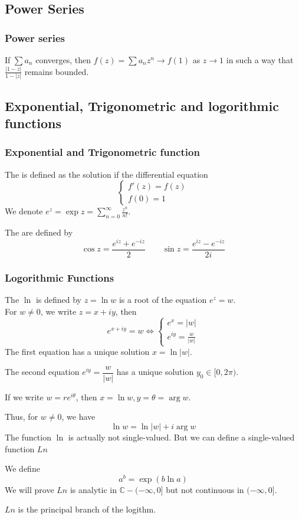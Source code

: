 \subsection{Power Series}
\subsubsection{Power series}
\begin{theorem}
If  $ \sum a_n  $ converges, then  $ f(z)=\sum a_nz^n\rightarrow f(1)  $ as  $ z\rightarrow 1  $ in such a way that  $ \frac{|1-z| }{1-|z| } $ remains bounded.
\end{theorem}
\subsection{Exponential, Trigonometric and logorithmic functions}
\subsubsection{Exponential and Trigonometric function}
The  is defined as the solution if the differential equation
\[\left\{
    \begin{aligned}
        f'(z)=f(z)\\
        f(0)=1
    \end{aligned}
\right.\]
We denote  $ e^z=\exp z=\sum\limits_{n=0}^\infty \frac{z^n}{n!} $.

The  are defined by 
\[\cos z=\frac{e^{iz}+e^{-iz}}{2}\qquad \sin z=\frac{e^{iz}-e^{-iz}}{2i}\]
\subsubsection{Logorithmic Functions}
The   $ \ln  $ is defined by  $ z=\ln w  $ is a root of the equation  $ e^z=w $.\\
For  $ w\not=0 $, we write  $ z=x+iy $, then 
\[e^{x+iy}=w\Leftrightarrow 
\left\{
    \begin{aligned}
        e^x=|w|\\
        e^{iy}=\frac{w }{|w|}
    \end{aligned}
\right.\]   
The first equation has a unique solution  $ x=\ln|w|  $.

The second equation  $ e^{iy}=\dfrac{w }{|w|}  $ has a unique solution  $ y_0\in [0,2\pi) $.

If we write  $ w=re^{i\theta} $, then  $ x=\ln w,y=\theta =\arg w $.

Thus, for  $ w\not=0  $, we have 
\[\ln w=\ln|w|+i\arg w\]
The function  $ \ln  $ is actually not single-valued. But we can define a single-valued function  $ Ln $ 

We define 
\[a^b=\exp(b\ln a)\]   
We will prove  $ Ln  $ is analytic in  $ \mathbb{C}-(-\infty,0] $ but not continuous in  $ (-\infty,0] $.

$ Ln  $ is the principal branch of the logithm.   